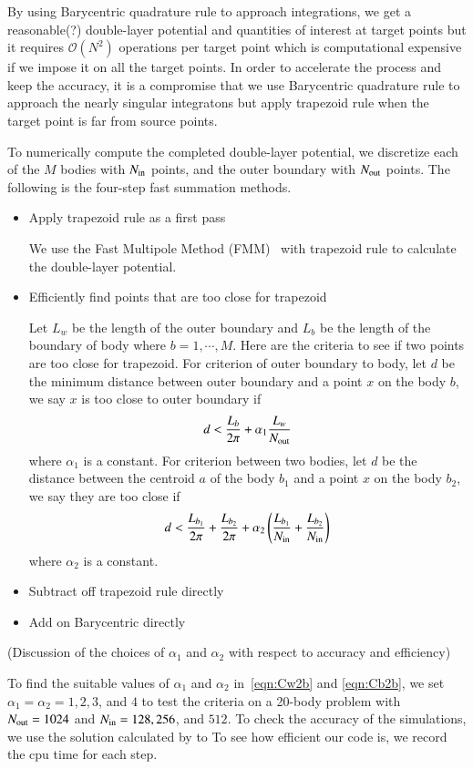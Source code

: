 \documentclass[preprint, 10pt]{elsarticle}
\begin{document}
{\color{red}
By using Barycentric quadrature rule to approach integrations, we get a reasonable(?) double-layer potential and quantities of interest at target points but it requires $\mathcal{O}(N^2)$ operations per target point which is computational expensive if we impose it on all the target points. In order to accelerate the process and keep the accuracy, it is a compromise that we use Barycentric quadrature rule to approach the nearly singular integratons but apply trapezoid rule when the target point is far from source points. 


To numerically compute the completed double-layer potential, we discretize each of the $M$ bodies with  $N_{\mathrm{in}}$ points, and the outer boundary with $N_{\mathrm{out}}$ points. The following is the four-step fast summation methods.
}
\begin{itemize}
  \item Apply trapezoid rule as a first pass

{\color{red} We use the Fast Multipole Method (FMM)~\cite{gre-rok1987, gre-gre-may1992} with trapezoid rule to calculate the double-layer potential.
}
  \item Efficiently find points that are too close for trapezoid

{\color{red}
 Let $L_w$ be the length of the outer boundary and $L_{b}$ be the length of the boundary of body where $b=1, \cdots, M$. Here are the criteria to see if two points are too close for trapezoid. For criterion of outer boundary to body,  let $d$ be the minimum distance between outer boundary and a point $x$ on the body $b$, we say $x$ is too close to outer boundary if
\begin{equation}\label{eqn:Cw2b}
d<\frac{L_{b}}{2\pi} + \alpha_1\frac{L_w}{N_{\mathrm{out}}}
\end{equation}
where $\alpha_1$ is a constant. 
For criterion between two bodies, let $d$ be the distance between the centroid $a$ of the body $b_1$ and a point $x$ on the body $b_2$, we say they are too close if
\begin{equation}\label{eqn:Cb2b}
d<\frac{L_{b_1}}{2\pi}+\frac{L_{b_2}}{2\pi}+\alpha_2\left(\frac{L_{b_1}}{N_{\mathrm{in}}}+\frac{L_{b_2}}{N_{\mathrm{in}}}\right)
\end{equation}
where $\alpha_2$ is a constant. 

}
  \item Subtract off trapezoid rule directly
  \item Add on Barycentric directly
\end{itemize}
{\color{red}  (Discussion of the choices of $\alpha_1$ and $\alpha_2$ with respect to accuracy and  efficiency)

To find the suitable values of $\alpha_1$ and $\alpha_2$ in~\eqref{eqn:Cw2b} and \eqref{eqn:Cb2b}, we set $\alpha_1=\alpha_2=1, 2, 3$, and $4$ to test the criteria on a 20-body problem with $N_{\mathrm{out}} = 1024$ and $N_{\mathrm{in}} = 128, 256$, and $512$. To check the accuracy of the simulations, we use the solution calculated by  to 
To see how efficient our code is, we record the cpu time for each step.

}
\end{document}
